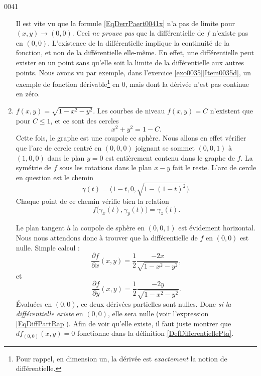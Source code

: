 \begin{corrige}{0041}
\begin{enumerate}
\begin{remark}	\label{Rem0041DiffExCon}
Il est vite vu que la formule \eqref{EqDerrPaert0041x} n'a pas de limite pour $(x,y)\to(0,0)$. Ceci \emph{ne prouve pas} que la différentielle de $f$ n'existe pas en $(0,0)$. L'existence de la différentielle implique la continuité de la fonction, et non de la différentielle elle-même. En effet, une différentielle peut exister en un point sans qu'elle soit la limite de la différentielle aux autres points. Nous avons vu par exemple, dans l'exercice \ref{exo0035}\ref{Item0035d}, un exemple de fonction dérivable\footnote{Pour rappel, en dimension un, la dérivée est \emph{exactement} la notion de différentielle.} en $0$, mais dont la dérivée n'est pas continue en zéro.
\end{remark}


\item
$f(x,y)=\sqrt{1-x^2-y^2}$. Les courbes de niveau $f(x,y)=C$ n'existent que pour $C\leq 1$, et ce sont des cercles
\begin{equation}
	x^2+y^2=1-C.
\end{equation}
Cette fois, le graphe est une coupole ce sphère. Nous allons en effet vérifier que l'arc de cercle centré en $(0,0,0)$ joignant se sommet $(0,0,1)$ à $(1,0,0)$ dans le plan $y=0$ est entièrement contenu dans le graphe de $f$. La symétrie de $f$ sous les rotations dans le plan $x-y$ fait le reste. L'arc de cercle en question est le chemin
\begin{equation}
	\gamma(t)=\big( 1-t,0,\sqrt{1-(1-t)^2} \big).
\end{equation}
Chaque point de ce chemin vérifie bien la relation
\begin{equation}
	f\big( \gamma_x(t),\gamma_y(t) \big)=\gamma_z(t).
\end{equation}

Le plan tangent à la coupole de sphère en $(0,0,1)$ est évidement horizontal. Nous nous attendons donc à trouver que la différentielle de $f$ en $(0,0)$ est nulle. Simple calcul :
\begin{equation}
	\frac{ \partial f }{ \partial x }(x,y)=\frac{ 1 }{2}\frac{ -2x }{ \sqrt{1-x^2-y^2} },
\end{equation}
et 
\begin{equation}
	\frac{ \partial f }{ \partial y }(x,y)=\frac{ 1 }{2}\frac{ -2y }{ \sqrt{1-x^2-y^2} }.
\end{equation}
Évaluées en $(0,0)$, ce deux dérivées partielles sont nulles. Donc \emph{si la différentielle existe} en $(0,0)$, elle sera nulle (voir l'expression \eqref{EqDiffPartRap}). Afin de voir qu'elle existe, il faut juste montrer que $df_{(0,0)}(x,y)=0$ fonctionne dans la définition \ref{DefDifferentiellePta}.


\end{enumerate}
\end{corrige}
